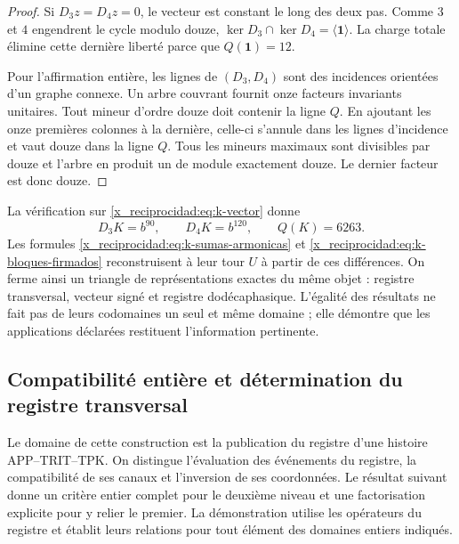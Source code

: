 \begin{proof}
Si \(D_3z=D_4z=0\), le vecteur est constant le long des deux pas.
Comme \(3\) et \(4\) engendrent le cycle modulo douze,
\(\ker D_3\cap\ker D_4=\langle\mathbf1\rangle\). La charge totale
élimine cette dernière liberté parce que \(Q(\mathbf1)=12\).

Pour l'affirmation entière, les lignes de \((D_3,D_4)\) sont des incidences orientées d'un graphe connexe. Un arbre couvrant fournit onze facteurs invariants unitaires. Tout mineur d'ordre douze doit contenir la ligne \(Q\). En ajoutant les onze premières colonnes à la dernière, celle-ci s'annule dans les lignes d'incidence et vaut douze dans la ligne \(Q\). Tous les mineurs maximaux sont divisibles par douze et l'arbre en produit un de module exactement douze. Le dernier facteur est donc douze.
\end{proof}

La vérification sur \eqref{x_reciprocidad:eq:k-vector} donne
\[
 D_3K=b^{90},\qquad D_4K=b^{120},\qquad Q(K)=6263.
\]
Les formules \eqref{x_reciprocidad:eq:k-sumas-armonicas} et
\eqref{x_reciprocidad:eq:k-bloques-firmados} reconstruisent à leur tour \(U\) à partir de ces
différences. On ferme ainsi un triangle de représentations exactes du
même objet : registre transversal, vecteur signé et registre dodécaphasique. L'égalité
des résultats ne fait pas de leurs codomaines un seul et même domaine ; elle démontre que
les applications déclarées restituent l'information pertinente.


\subsection{Compatibilité entière et détermination du registre transversal}
\label{x_reciprocidad:img09:seccion}

Le domaine de cette construction est la publication du registre d'une
histoire APP--TRIT--TPK. On distingue l'évaluation des événements du
registre, la compatibilité de ses canaux et l'inversion de ses
coordonnées. Le résultat suivant donne un critère entier complet pour
le deuxième niveau et une factorisation explicite pour y relier le premier.
La démonstration utilise les opérateurs du registre et établit leurs
relations pour tout élément des domaines entiers indiqués.

